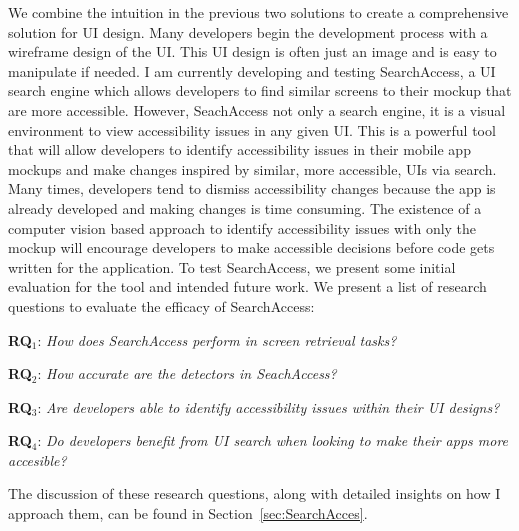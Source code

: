 We combine the intuition in the previous two solutions to create a comprehensive solution for UI design. Many developers begin the development process with a wireframe design of the UI. This UI design is often just an image and is easy to manipulate if needed. I am currently developing and testing SearchAccess, a UI search engine which allows developers to find similar screens to their mockup that are more accessible. However, SeachAccess not only a search engine, it is a visual environment to view accessibility issues in any given UI. This is a powerful tool that will allow developers to identify accessibility issues in their mobile app mockups and make changes inspired by similar, more accessible, UIs via search. Many times, developers tend to dismiss accessibility changes because the app is already developed and making changes is time consuming. The existence of a computer vision based approach to identify accessibility issues with only the mockup will encourage developers to make accessible decisions before code gets written for the application. To test SearchAccess, we present some initial evaluation for the tool and intended future work. We present a list of research questions to evaluate the efficacy of SearchAccess: 

\begin{description}
  
    \item \textbf{RQ$_1$}: \textit{How does SearchAccess perform in screen retrieval tasks?}
    \item \textbf{RQ$_2$}: \textit{How accurate are the detectors in SeachAccess?}
    \item \textbf{RQ$_3$}: \textit{Are developers able to identify accessibility issues within their UI designs?}
    \item \textbf{RQ$_4$}: \textit{Do developers benefit from UI search when looking to make their apps more accesible?}
 \end{description}
The discussion of these research questions, along with detailed insights on how I approach them, can be found in Section~\ref{sec:SearchAcces}.




